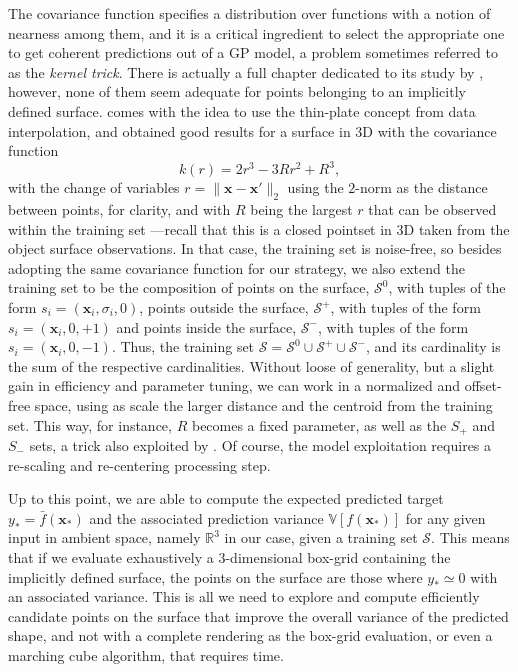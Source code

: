 The covariance function specifies a distribution over functions with a notion of nearness among them, and it is a critical ingredient to select the appropriate one to get coherent predictions out of a GP model, a problem sometimes referred to as the \emph{kernel trick}. There is actually a full chapter dedicated to its study by \citet[see Ch. 4]{Rasmussen2006Gaussian}, however, none of them seem adequate for points belonging to an implicitly defined surface. \citet{Williams2007Gaussian} comes with the idea to use the thin-plate concept from data interpolation, and obtained good results for a surface in 3D with the covariance function
\begin{equation}
k(r) = 2r^{3} - 3Rr^2 + R^3,
\end{equation} 
with the change of variables $r = \| \mathbf{x} - \mathbf{x}' \|_2$ using the $2$-norm as the distance between points, for clarity, and with $R$ being the largest $r$ that can be observed within the training set ---recall that this is a closed pointset in 3D taken from the object surface observations. In that case, the training set is noise-free, so besides adopting the same covariance function for our strategy, we also extend the training set to be the composition of points on the surface, $\mathcal{S}^0$, with tuples of the form $s_i = (\mathbf{x}_i, \sigma_i, 0)$, points outside the surface, $\mathcal{S}^+$, with tuples of the form $s_i = (\mathbf{x}_i, 0, +1)$ and points inside the surface, $\mathcal{S}^-$, with tuples of the form $s_i = (\mathbf{x}_i, 0, -1)$. Thus, the training set $\mathcal{S} = \mathcal{S}^0 \cup \mathcal{S}^+ \cup \mathcal{S}^-$, and its cardinality is the sum of the respective cardinalities. Without loose of generality, but a slight gain in efficiency and parameter tuning, we can work in a normalized and offset-free space, using as scale the larger distance and the centroid from the training set. This way, for instance, $R$ becomes a fixed parameter, as well as the $S_+$ and $S_-$ sets, a trick also exploited by \citet{Li2016Dexterous}. Of course, the model exploitation requires a re-scaling and re-centering processing step.

Up to this point, we are able to compute the expected predicted target $y_* = \bar{f}(\mathbf{x}_*)$ and the associated prediction variance $\mathbb{V}[f(\mathbf{x}_*)]$ for any given input in ambient space, namely $\mathbb{R}^3$ in our case, given a training set $\mathcal{S}$. This means that if we evaluate exhaustively a $3$-dimensional box-grid containing the implicitly defined surface, the points on the surface are those where $y_* \simeq 0$ with an associated variance. This is all we need to explore and compute efficiently candidate points on the surface that improve the overall variance of the predicted shape, and not with a complete rendering as the box-grid evaluation, or even a marching cube algorithm, that requires time. 

